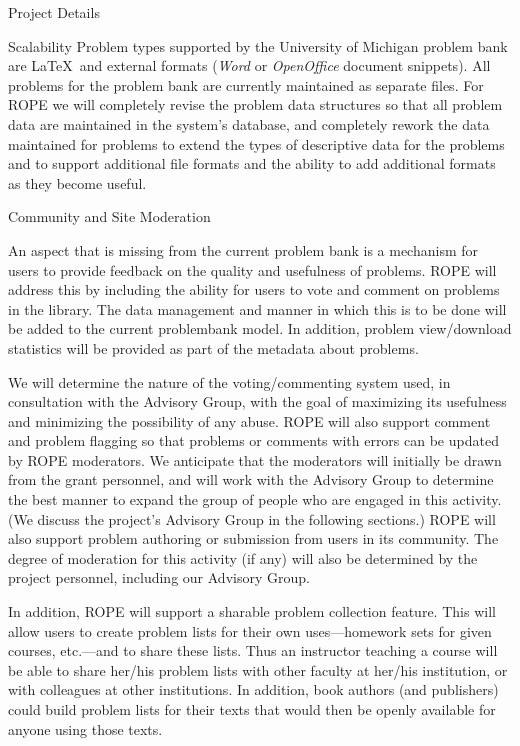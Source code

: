 \documentclass[11pt]{article}
\begin{document}
\begin{section}{Project Details}
\begin{subsection}{Scalability}
Problem types supported by the University of Michigan problem bank are
\LaTeX\ and external formats (\emph{Word} or \emph{OpenOffice} document
snippets). All problems for the problem bank are currently maintained as
separate files. For ROPE we will completely revise the problem data
structures so that all problem data are maintained in the system's
database, and completely rework the data maintained for problems to extend
the types of descriptive data for the problems and to support additional
file formats and the ability to add additional formats as they become
useful.

\end{subsection}

\begin{subsection}{Community and Site Moderation}

An aspect that is missing from the current problem bank is a mechanism for
users to provide feedback on the quality and usefulness of problems. ROPE will address this by including the ability for users to vote and
comment on problems in the library.  The data management and manner in
which this is to be done will be added to the current problembank
model.  In addition, problem view/download statistics will be provided as
part of the metadata about problems.

We will determine the nature of the voting/commenting system used, in
consultation with the Advisory Group, with the goal of maximizing its
usefulness and minimizing the possibility of any abuse. ROPE will also
support comment and problem flagging so that problems or comments with
errors can be updated by ROPE moderators. We anticipate that the moderators
will initially be drawn from the grant personnel, and will work with the
Advisory Group to determine the best manner to expand the group of people
who are engaged in this activity.  (We discuss the project's Advisory
Group in the following sections.)  ROPE will also support problem
authoring or submission from users in its community.  The degree of
moderation for this activity (if any) will also be determined by the
project personnel, including our Advisory Group.

In addition, ROPE will support a sharable problem collection feature.
This will allow users to create problem lists for their own
uses---homework sets for given courses, etc.---and to share these lists.
Thus an instructor teaching a course will be able to share her/his problem
lists with other faculty at her/his institution, or with colleagues at
other institutions.  In addition, book authors (and publishers) could
build problem lists for their texts that would then be openly available
for anyone using those texts.


\end{subsection}
\end{section}
\end{document}
